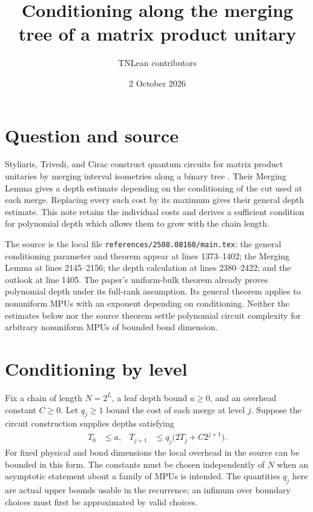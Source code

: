 \documentclass[11pt]{article}
\title{Conditioning along the merging tree of a matrix product unitary}
\author{TNLean contributors}
\date{2 October 2026}
\begin{document}
\maketitle

\section{Question and source}

Styliaris, Trivedi, and Cirac construct quantum circuits for matrix product
unitaries by merging interval isometries along a binary tree
\cite{STC25}. Their Merging Lemma gives a depth estimate depending on the
conditioning of the cut used at each merge. Replacing every such cost by its
maximum gives their general depth estimate. This note retains the individual
costs and derives a sufficient condition for polynomial depth which allows
them to grow with the chain length.

The source is the local file
\texttt{references/2508.08160/main.tex}: the general conditioning parameter
and theorem appear at lines 1373--1402; the Merging Lemma at lines
2145--2156; the depth calculation at lines 2380--2422; and the outlook at
line 1405. The paper's uniform-bulk theorem already proves polynomial depth
under its full-rank assumption. Its general theorem applies to nonuniform
MPUs with an exponent depending on conditioning. Neither the estimates
below nor the source theorem settle polynomial circuit complexity for
arbitrary nonuniform MPUs of bounded bond dimension.

\section{Conditioning by level}

Fix a chain of length $N=2^L$, a leaf depth bound $a\geq0$, and an overhead
constant $C\geq0$. Let $q_j\geq1$ bound the cost of each merge at level $j$.
Suppose the circuit construction supplies depths satisfying
\begin{align}
 T_0&\leq a,&
 T_{j+1}&\leq q_j\bigl(2T_j+C2^{j+1}\bigr).
 \label{eq:recurrence}
\end{align}
For fixed physical and bond dimensions the local overhead in the source
can be bounded in this form. The constants must be chosen independently of
$N$ when an asymptotic statement about a family of MPUs is intended.
The quantities $q_j$ here are actual upper bounds usable in the recurrence;
an infimum over boundary choices must first be approximated by valid choices.
\end{document}
